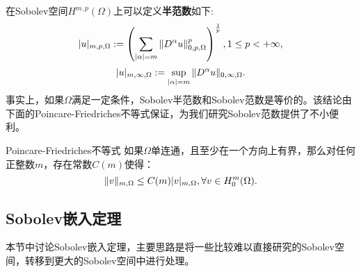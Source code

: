 在Sobolev空间$H^{m,p}(\Omega)$上可以定义\textbf{半范数}如下:
\begin{equation}
    |u|_{m,p,\Omega}:=\left(\sum_{|\alpha|=m}\|D^{\alpha}u\|_{0,p,\Omega}^{p}\right)^{\frac{1}{p}},1\le p<+\infty,
\end{equation}
\begin{equation}
    |u|_{m,\infty,\Omega}:=\sup_{|\alpha|=m}\|D^{\alpha}u\|_{0,\infty,\Omega}.
\end{equation}
事实上，如果$\Omega$满足一定条件，Sobolev半范数和Sobolev范数是等价的。该结论由下面的Poincare-Friedriches不等式保证，为我们研究Sobolev范数提供了不小便利。
\begin{theorem}{Poincare-Friedriches不等式}
    如果$\Omega$单连通，且至少在一个方向上有界，那么对任何正整数$m$，存在常数$C(m)$使得：
    \begin{equation}
        \|v\|_{m,\Omega}\le C(m)|v|_{m,\Omega},\forall v\in H_{0}^{m}(\Omega).
    \end{equation}
\end{theorem}
\subsection{Sobolev嵌入定理}
本节中讨论Sobolev嵌入定理，主要思路是将一些比较难以直接研究的Sobolev空间，转移到更大的Sobolev空间中进行处理。


